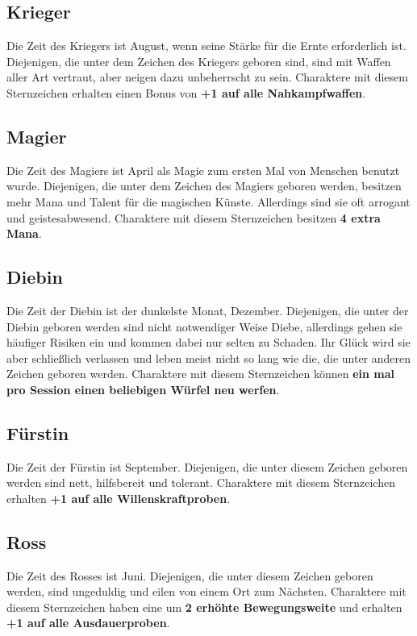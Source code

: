 \documentclass[../../Heldenanleitung2]{subfiles}
\begin{document}
\subsection{Krieger}
Die Zeit des Kriegers ist August, wenn seine Stärke für die Ernte erforderlich ist. Diejenigen, die unter dem Zeichen des Kriegers geboren sind, sind mit Waffen aller Art vertraut, aber neigen dazu unbeherrscht zu sein. Charaktere mit diesem Sternzeichen erhalten einen Bonus von \textbf{+1 auf alle Nahkampfwaffen}.

\subsection{Magier}
Die Zeit des Magiers ist April als Magie zum ersten Mal von Menschen benutzt wurde. Diejenigen, die unter dem Zeichen des Magiers geboren werden, besitzen mehr Mana und Talent für die magischen Künste. Allerdings sind sie oft arrogant und geistesabwesend. Charaktere mit diesem Sternzeichen besitzen \textbf{4 extra Mana}.

\subsection{Diebin}
Die Zeit der Diebin ist der dunkelste Monat, Dezember. Diejenigen, die unter der Diebin geboren werden sind nicht notwendiger Weise Diebe, allerdings gehen sie häufiger Risiken ein und kommen dabei nur selten zu Schaden. Ihr Glück wird sie aber schließlich verlassen und leben meist nicht so lang wie die, die unter anderen Zeichen geboren werden. Charaktere mit diesem Sternzeichen können \textbf{ein mal pro Session einen beliebigen Würfel neu werfen}.

\subsection{Fürstin}
Die Zeit der Fürstin ist September. Diejenigen, die unter diesem Zeichen geboren werden sind nett, hilfsbereit und tolerant. Charaktere mit diesem Sternzeichen erhalten \textbf{+1 auf alle Willenskraftproben}.

\subsection{Ross}
Die Zeit des Rosses ist Juni. Diejenigen, die unter diesem Zeichen geboren werden, sind ungeduldig und eilen von einem Ort zum Nächsten. Charaktere mit diesem Sternzeichen haben eine um \textbf{2 erhöhte Bewegungsweite} und erhalten \textbf{+1 auf alle Ausdauerproben}.
\end{document}
